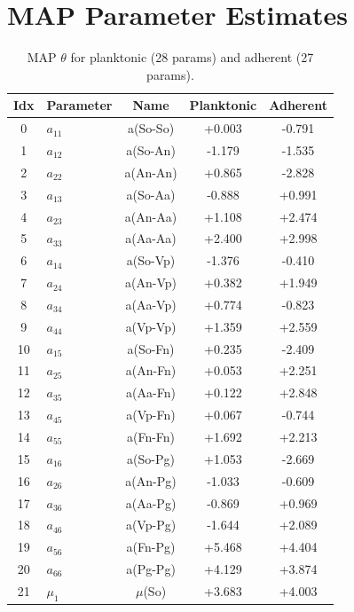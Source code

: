 \documentclass[11pt,a4paper]{article}
\begin{document}
\section{MAP Parameter Estimates}

\begin{table}[H]\centering\small
\caption{MAP $\theta$ for planktonic (28 params) and adherent (27 params).}
\label{tab:map}
\begin{tabular}{clccc}
\toprule
Idx & Parameter & Name & Planktonic & Adherent \\
\midrule
    0 & $a_{11}$ & a(So-So)     & +0.003 & -0.791 \\
    1 & $a_{12}$ & a(So-An)     & -1.179 & -1.535 \\
    2 & $a_{22}$ & a(An-An)     & +0.865 & -2.828 \\
    3 & $a_{13}$ & a(So-Aa)     & -0.888 & +0.991 \\
    4 & $a_{23}$ & a(An-Aa)     & +1.108 & +2.474 \\
    5 & $a_{33}$ & a(Aa-Aa)     & +2.400 & +2.998 \\
    6 & $a_{14}$ & a(So-Vp)     & -1.376 & -0.410 \\
    7 & $a_{24}$ & a(An-Vp)     & +0.382 & +1.949 \\
    8 & $a_{34}$ & a(Aa-Vp)     & +0.774 & -0.823 \\
    9 & $a_{44}$ & a(Vp-Vp)     & +1.359 & +2.559 \\
   10 & $a_{15}$ & a(So-Fn)     & +0.235 & -2.409 \\
   11 & $a_{25}$ & a(An-Fn)     & +0.053 & +2.251 \\
   12 & $a_{35}$ & a(Aa-Fn)     & +0.122 & +2.848 \\
   13 & $a_{45}$ & a(Vp-Fn)     & +0.067 & -0.744 \\
   14 & $a_{55}$ & a(Fn-Fn)     & +1.692 & +2.213 \\
   15 & $a_{16}$ & a(So-Pg)     & +1.053 & -2.669 \\
   16 & $a_{26}$ & a(An-Pg)     & -1.033 & -0.609 \\
   17 & $a_{36}$ & a(Aa-Pg)     & -0.869 & +0.969 \\
   18 & $a_{46}$ & a(Vp-Pg)     & -1.644 & +2.089 \\
   19 & $a_{56}$ & a(Fn-Pg)     & +5.468 & +4.404 \\
   20 & $a_{66}$ & a(Pg-Pg)     & +4.129 & +3.874 \\
   21 & $\mu_1$ & $\mu$(So)    & +3.683 & +4.003 \\

\end{tabular}
\end{table}
\end{document}
